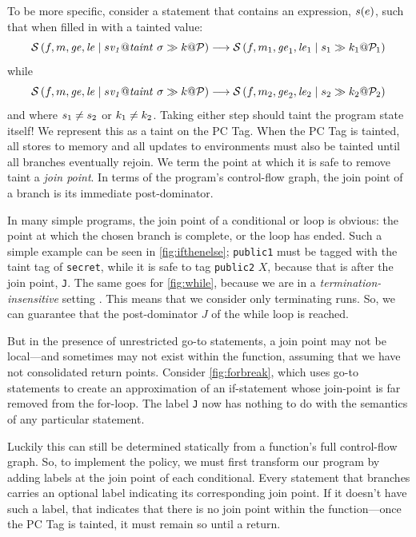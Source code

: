 \documentclass[acmsmall,review,anonymous]{acmart}\settopmatter{printfolios=true,printccs=false,printacmref=false}
\begin{document}
To be more specific, consider a statement that contains an expression, \(s(e)\),
such that when filled in with a tainted value:
%
\[\mathcal{S}\left(f,m,\mathit{ge},\mathit{le} \mid s\mathit{v_1} @ \mathit{taint} ~ \sigma \gg k @ \mathcal{P}\right) \longrightarrow
\mathcal{S}\left(f,m_1,\mathit{ge}_1,\mathit{le}_1 \mid s_1 \gg k_1 @ \mathcal{P}_1\right)\]
%
while
%
\[\mathcal{S}\left(f,m,\mathit{ge},\mathit{le} \mid s\mathit{v_1} @ \mathit{taint} ~ \sigma \gg k @ \mathcal{P}\right) \longrightarrow
\mathcal{S}\left(f,m_2,\mathit{ge}_2,\mathit{le}_2 \mid s_2 \gg k_2 @ \mathcal{P}_2\right)\]
%
and where \(s_1 \not = s_2\) or \(k_1 \not = k_2\). Taking either step
should taint the program state itself! We represent this as a taint on the PC Tag.
When the PC Tag is tainted, all stores to memory and all updates to environments must
also be tainted until all branches eventually rejoin.
We term the point at which it is safe to remove taint a {\it join point}.
In terms of the program's control-flow graph, the
join point of a branch is its immediate post-dominator.

In many simple programs, the join point of a conditional or loop is obvious:
the point at which the chosen branch is complete, or the loop has ended.
Such a simple example can be seen in \cref{fig:ifthenelse}; {\tt public1} must be
tagged with the taint tag of {\tt secret}, while it is safe to tag {\tt public2}
\(X\), because that is after the join point, {\tt J}. The same goes for \cref{fig:while},
because we are in a {\em termination-insensitive} setting \cite{}. This means that we
consider only terminating runs. So, we can guarantee that the post-dominator \(J\)
of the while loop is reached.

But in the presence of unrestricted go-to statements, a join point may not be
local---and sometimes may not exist within the function, assuming that we have not
consolidated return points. Consider \cref{fig:forbreak}, which
uses go-to statements to create an approximation of an if-statement whose join-point
is far removed from the for-loop. The label {\tt J} now has nothing to do with the
semantics of any particular statement.

Luckily this can still be determined statically from a function's full
control-flow graph. So, to implement the policy, we must first transform our program
by adding labels at the join point of each conditional.
Every statement that branches carries an optional label indicating its corresponding
join point. If it doesn't have such
a label, that indicates that there is no join point within the function---once the PC Tag is tainted,
it must remain so until a return.
\end{document}

